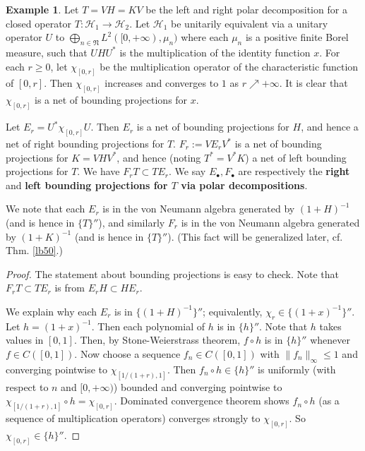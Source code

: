 \documentclass[12pt,a4paper,notitlepage]{article}
\theoremstyle{definition}
\newtheorem{eg}[df]{Example}
\theoremstyle{plain}
\newcommand{\fk}{\mathfrak}
\newcommand{\mc}{\mathcal}
\newcommand{\blt}{\bullet}
\numberwithin{equation}{section}
\begin{document}
\begin{eg}\label{lb37}
Let $T=VH=KV$ be the left and right polar decomposition for a closed operator $T:\mc H_1\rightarrow\mc H_2$. Let $\mc H_1$ be unitarily equivalent via a unitary operator $U$ to $\bigoplus_{n\in\fk N}L^2([0,+\infty),\mu_n)$ where each $\mu_n$ is a positive finite  Borel measure, such that $UHU^*$ is the multiplication of the identity function $x$. For each $r\geq 0$, let $\chi_{[0,r]}$ be the multiplication operator of the characteristic function of $[0,r]$. Then $\chi_{[0,r]}$ increases and converges to $1$ as $r\nearrow+\infty$. It is clear that $\chi_{[0,r]}$ is a net of bounding projections for $x$.  

Let $E_r=U^*\chi_{[0,r]}U$. Then $E_r$ is a net of bounding projections for $H$, and hence a net of right bounding projections for $T$. $F_r:=VE_rV^*$ is a net of bounding projections for $K=VHV^*$, and hence (noting $T^*=V^*K$) a net of left bounding projections for $T$. We have $F_rT\subset TE_r$. We say $E_\blt,F_\blt$ are respectively the \textbf{right} and \textbf{left bounding projections for $T$ via polar decompositions}.  

We note that each $E_r$ is in the von Neumann algebra generated by $(1+H)^{-1}$ (and is hence in $\{T\}''$), and similarly $F_r$ is in the von Neumann algebra generated by $(1+K)^{-1}$ (and is hence in $\{T\}''$). (This fact will be generalized later, cf. Thm. \ref{lb50}.)
\end{eg}


\begin{proof}
The statement about bounding projections is easy to check. Note that $F_rT\subset TE_r$ is from $E_rH\subset HE_r$.
	
We explain why each $E_r$ is in $\{(1+H)^{-1}\}''$; equivalently, $\chi_r\in\{(1+x)^{-1}\}''$. Let $h=(1+x)^{-1}$. Then each polynomial of $h$ is in $\{h\}''$. Note that $h$ takes values in $[0,1]$. Then, by Stone-Weierstrass theorem,  $f\circ h$ is in $\{h\}''$  whenever $f\in C([0,1])$. Now choose a sequence $f_n\in C([0,1])$ with $\lVert f_n\lVert_\infty\leq1$ and converging pointwise to $\chi_{[1/(1+r),1]}$. Then $f_n\circ h\in\{h\}''$ is uniformly (with respect to $n$ and $[0,+\infty)$) bounded and converging pointwise  to $\chi_{[1/(1+r),1]}\circ h=\chi_{[0,r]}$. Dominated convergence theorem shows $f_n\circ h$ (as a sequence of multiplication operators) converges strongly to $\chi_{[0,r]}$. So $\chi_{[0,r]}\in\{h\}''$.
\end{proof}
\end{document}
